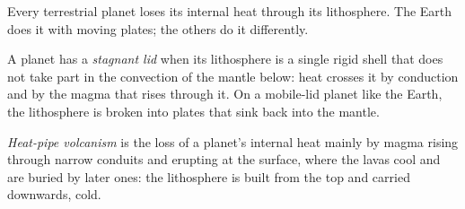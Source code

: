 Every terrestrial planet loses its internal heat through its lithosphere.
The Earth does it with moving plates; the others do it differently.

\begin{definition}\label{def:b3:planetary-interiors-surfaces:stagnant-lid}
A planet has a \emph{stagnant lid} when its lithosphere
is a single rigid shell that does not take part in the convection of the
mantle below: heat crosses it by conduction and by the magma that rises
through it. On a mobile-lid planet like the Earth, the lithosphere is
broken into plates that sink back into the mantle.
\end{definition}

\begin{definition}\label{def:b3:planetary-interiors-surfaces:heat-pipe}
\emph{Heat-pipe volcanism} is the loss of a
planet's internal heat mainly by magma rising through narrow conduits and
erupting at the surface, where the lavas cool and are buried by later
ones: the lithosphere is built from the top and carried downwards, cold.
\end{definition}

